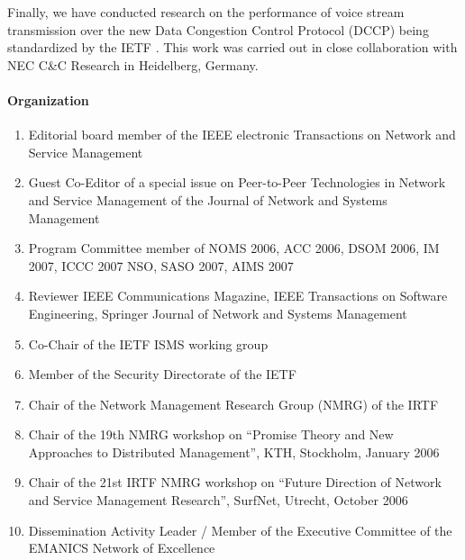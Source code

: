 Finally, we have conducted research on the performance of voice stream
transmission over the new Data Congestion Control Protocol (DCCP)
being standardized by the IETF \cite{BENB07}. This work was carried out in
close collaboration with NEC C\&C Research in Heidelberg, Germany.


\paragraph{Organization}\nobreak
\begin{enumerate}
    \item Editorial board member of the IEEE electronic Transactions on
          Network and Service Management
    \item Guest Co-Editor of a special issue on Peer-to-Peer
          Technologies in Network and Service Management of the
          Journal of Network and Systems Management
    \item Program Committee member of NOMS 2006, ACC 2006, DSOM 2006,
          IM 2007, ICCC 2007 NSO, SASO 2007, AIMS 2007
    \item Reviewer IEEE Communications Magazine, IEEE Transactions on
          Software Engineering, Springer Journal of Network and
      Systems Management
    \item Co-Chair of the IETF ISMS working group
    \item Member of the Security Directorate of the IETF
    \item Chair of the Network Management Research Group (NMRG) of the IRTF
    \item Chair of the 19th NMRG workshop on ``Promise Theory and New
          Approaches to Distributed Management'', KTH, Stockholm, January
          2006
    \item Chair of the 21st IRTF NMRG workshop on ``Future Direction
          of Network and Service Management Research'', SurfNet,
          Utrecht, October 2006
    \item Dissemination Activity Leader / Member of the Executive
          Committee of the EMANICS Network of Excellence
\end{enumerate}

